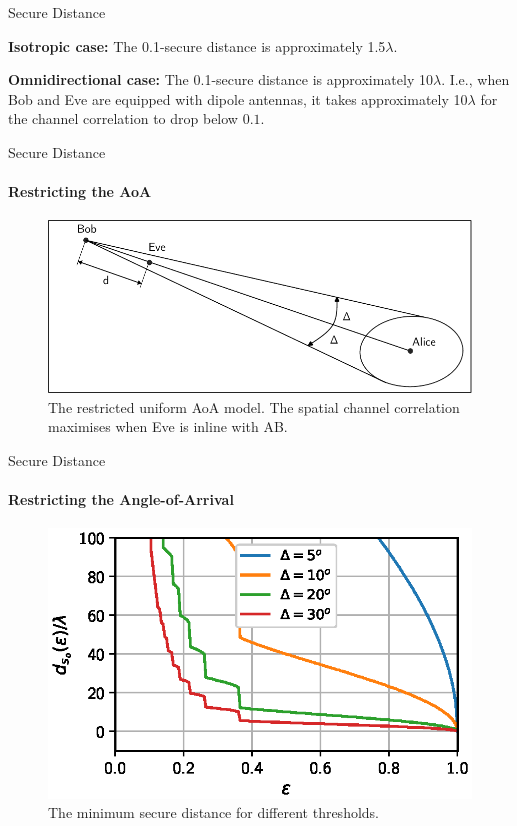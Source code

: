 \begin{frame}{Secure Distance}
\begin{example}
\textbf{Isotropic case:} The 0.1-secure distance is approximately 1.5$\lambda$.
\end{example}
\begin{example}
    \textbf{Omnidirectional case:} The 0.1-secure distance is approximately 10$\lambda$.
I.e., when Bob and Eve are equipped with dipole antennas, it takes approximately 10$\lambda$ for the channel correlation to drop below $0.1$.
\end{example}    
\end{frame}


\begin{frame}{Secure Distance}
\framesubtitle{Restricting the AoA}
\begin{figure}
    \centering
    \includegraphics[scale = 0.7]{figures/key_generation_and_spatial_seperation/directional_optimal_eve.pdf}
    \caption{The restricted uniform AoA model. The spatial channel correlation maximises when Eve is inline with AB.}
\end{figure}    
\end{frame}

\begin{frame}{Secure Distance}
\framesubtitle{Restricting the Angle-of-Arrival}
\begin{figure}
    \centering
    \includegraphics[scale = 0.9]{figures/key_generation_and_spatial_seperation/securedistDelta30zoom.eps}
    \caption{The minimum secure distance for different thresholds.}
\end{figure}
\end{frame}

